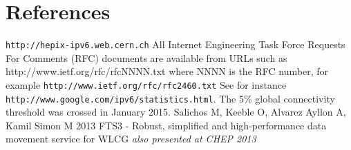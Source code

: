 \section*{References}

\begin{thebibliography}{1}
 {\tt http://hepix-ipv6.web.cern.ch}
 All Internet Engineering Task Force Requests For Comments (RFC) documents are available
from URLs such as http://www.ietf.org/rfc/rfcNNNN.txt where NNNN is the RFC number, for example {\tt http://www.ietf.org/rfc/rfc2460.txt}
 See for instance {\tt http://www.google.com/ipv6/statistics.html}. The 5\% global connectivity threshold was crossed in January 2015.
    Salichos M, Keeble O, Alvarez Ayllon A, Kamil Simon M 2013 FTS3 - Robust, simplified and high-performance data movement service for WLCG {\it also presented at CHEP 2013}
\end{thebibliography}
